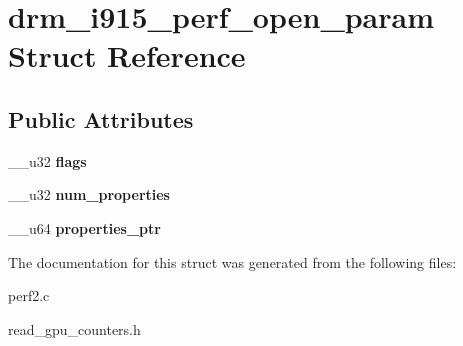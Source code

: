 \hypertarget{structdrm__i915__perf__open__param}{}\section{drm\+\_\+i915\+\_\+perf\+\_\+open\+\_\+param Struct Reference}
\label{structdrm__i915__perf__open__param}
\subsection*{Public Attributes}
\begin{DoxyCompactItemize}
\item 
\mbox{\label{structdrm__i915__perf__open__param_ae65800995ecdf4769f7adf86985ffeae}} 
\+\_\+\+\_\+u32 {\bfseries flags}
\item 
\mbox{\label{structdrm__i915__perf__open__param_a126cec5196effefb5d272c0a534d389b}} 
\+\_\+\+\_\+u32 {\bfseries num\+\_\+properties}
\item 
\mbox{\label{structdrm__i915__perf__open__param_a2b5d23b370e151342ed1a093ea2c23f0}} 
\+\_\+\+\_\+u64 {\bfseries properties\+\_\+ptr}
\end{DoxyCompactItemize}


The documentation for this struct was generated from the following files\+:\begin{DoxyCompactItemize}
\item 
perf2.\+c\item 
read\+\_\+gpu\+\_\+counters.\+h\end{DoxyCompactItemize}
